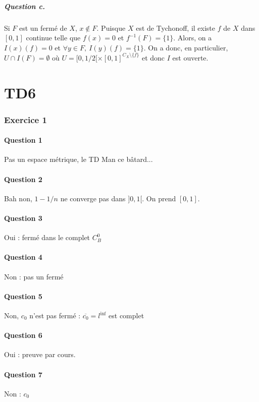 \documentclass{cours}
\begin{document}
\subsubsection{Question c.}
Si $F$ est un fermé de $X$, $x \notin F$. Puisque $X$ est de Tychonoff, il existe $f$ de $X$ dans $[0, 1]$ continue telle que $f(x) = 0$ et $f^{-1}(F) = \{1\}$. Alors, on a $I(x)(f) = 0$ et $\forall y \in F, \ I(y)(f) = \{1\}$. On a donc, en particulier, $U \cap I(F) = \emptyset$ où $U = [0, 1/2[ \times [0, 1]^{C_{X} \setminus \{f\}}$ et donc $I$ est ouverte.


\part{TD6}
\section{Exercice 1}
\subsection{Question 1}
Pas un espace métrique, le TD Man ce bâtard...

\subsection{Question 2}
Bah non, $1 - 1/n$ ne converge pas dans $]0, 1[$. On prend $[0, 1]$.

\subsection{Question 3}
Oui : fermé dans le complet $C^{0}_{B}$

\subsection{Question 4}
Non : pas un fermé

\subsection{Question 5}
Non, $c_{0}$ n'est pas fermé : $\overline{c_{0}} = l^{\inf}$ est complet

\subsection{Question 6}
Oui : preuve par cours.

\subsection{Question 7}
Non : $c_{0}$
\end{document}
